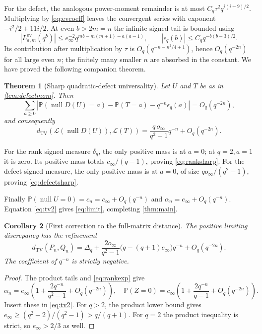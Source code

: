 \documentclass[11pt]{article}
\newtheorem{theorem}{Theorem}[section]
\newtheorem{corollary}[theorem]{Corollary}
\theoremstyle{definition}\newtheorem{definition}[theorem]{Definition}
\theoremstyle{remark}\newtheorem{remark}[theorem]{Remark}
\newcommand{\Prob}{\mathbb P}
\newcommand{\TV}{d_{\mathrm{TV}}}
\newcommand{\Law}{\mathcal L}
\newcommand{\nul}{\operatorname{null}}
\newcommand{\1}{\mathbf 1}
\begin{document}
For the defect, the analogous power-moment remainder is at most
$C_q\tau^2q^{i(i+9)/2}$. Multiplying by \eqref{eq:evcoeff} leaves the
convergent series with exponent $-i^2/2+11i/2$. At even $b>2m=n$ the
infinite signed tail is bounded using
\[
 |L^{\mathrm{ev}}_{a,m}(q^b)|\le
 e_\infty^{-2}q^{mb-m(m+1)-a(a-1)},\qquad
 |\epsilon_q(b)|\le C_q q^{-b(b-3)/2}.
\]
Its contribution after multiplication by $\tau$ is
$O_q(q^{-n-n^2/4+1})$, hence $O_q(q^{-2n})$ for all large even $n$;
the finitely many smaller $n$ are absorbed in the constant. We have proved
the following companion theorem.

\begin{theorem}[Sharp quadratic-defect universality]\label{thm:defect}
Let $U$ and $T$ be as in \cref{lem:defectmom}. Then
\begin{equation}\label{eq:defectexp}
 \sum_{a\ge0}\left|\Prob(\nul D(U)=a)-\Prob(T=a)
              -q^{-n}\epsilon_q(a)\right|=O_q(q^{-2n}),
\end{equation}
and consequently
\begin{equation}\label{eq:defectsharp}
 \TV(\Law(\nul D(U)),\Law(T))
  =\frac{q\,o_\infty}{q^2-1}q^{-n}+O_q(q^{-2n}).
\end{equation}
\end{theorem}

For the rank signed measure $\delta_q$, the only positive mass is at
$a=0$; at $q=2,a=1$ it is zero. Its positive mass totals
$c_\infty/(q-1)$, proving \eqref{eq:ranksharp}. For the defect signed
measure, the only positive mass is at $a=0$, of size
$q o_\infty/(q^2-1)$, proving \eqref{eq:defectsharp}.

Finally $\Prob(\nul U=0)=c_n=c_\infty+O_q(q^{-n})$ and
$\alpha_n=e_\infty+O_q(q^{-n})$. Equation \eqref{eq:tv2} gives
\eqref{eq:limit}, completing \cref{thm:main}.

\begin{corollary}[First correction to the full-matrix distance]
The positive limiting discrepancy has the refinement
\[
 \TV(P_n,Q_n)=\Delta_q+
 \frac{2o_\infty}{q^2-1}\bigl(q-(q+1)e_\infty\bigr)q^{-n}
       +O_q(q^{-2n}).
\]
The coefficient of $q^{-n}$ is strictly negative.
\end{corollary}
\begin{proof}
The product tails and \eqref{eq:rankexp} give
\[
 \alpha_n=e_\infty\left(1+\frac{2q^{-n}}{q^2-1}+O_q(q^{-2n})\right),
 \quad
 \Prob(Z=0)=c_\infty\left(1+\frac{2q^{-n}}{q-1}+O_q(q^{-2n})\right).
\]
Insert these in \eqref{eq:tv2}. For $q>2$, the product lower bound gives
$e_\infty\ge(q^2-2)/(q^2-1)>q/(q+1)$. For $q=2$ the product inequality
is strict, so $e_\infty>2/3$ as well.
\end{proof}
\end{document}
